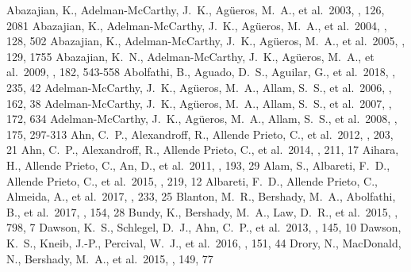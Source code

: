 
	\begin{thebibliography}{}

 Abazajian, K., Adelman-McCarthy, J.~K., Ag{\"u}eros, M.~A., et al.\ 2003, \aj, 126, 2081 %
 Abazajian, K., Adelman-McCarthy, J.~K., Ag{\"u}eros, M.~A., et al.\ 2004, \aj, 128, 502 %
 Abazajian, K., Adelman-McCarthy, J.~K., Ag{\"u}eros, M.~A., et al.\ 2005, \aj, 129, 1755 %
 Abazajian, K.~N., Adelman-McCarthy, J.~K., Ag{\"u}eros, M.~A., et al.\ 2009, \apjs, 182, 543-558 %
 Abolfathi, B., Aguado, D.~S., Aguilar, G., et al.\ 2018, \apjs, 235, 42 %
 Adelman-McCarthy, J.~K., Ag{\"u}eros, M.~A., Allam, S.~S., et al.\ 2006, \apjs, 162, 38 %
 Adelman-McCarthy, J.~K., Ag{\"u}eros, M.~A., Allam, S.~S., et al.\ 2007, \apjs, 172, 634 %
 Adelman-McCarthy, J.~K., Ag{\"u}eros, M.~A., Allam, S.~S., et al.\ 2008, \apjs, 175, 297-313 %
 Ahn, C.~P., Alexandroff, R., Allende Prieto, C., et al.\ 2012, \apjs, 203, 21 %
 Ahn, C.~P., Alexandroff, R., Allende Prieto, C., et al.\ 2014, \apjs, 211, 17 %
 Aihara, H., Allende Prieto, C., An, D., et al.\ 2011, \apjs, 193, 29 %
 Alam, S., Albareti, F.~D., Allende Prieto, C., et al.\ 2015, \apjs, 219, 12 %
 Albareti, F.~D., Allende Prieto, C., Almeida, A., et al.\ 2017, \apjs, 233, 25 %
 Blanton, M.~R., Bershady, M.~A., Abolfathi, B., et al.\ 2017, \aj, 154, 28 %
 Bundy, K., Bershady, M.~A., Law, D.~R., et al.\ 2015, \apj, 798, 7 %
 Dawson, K.~S., Schlegel, D.~J., Ahn, C.~P., et al.\ 2013, \aj, 145, 10 %
 Dawson, K.~S., Kneib, J.-P., Percival, W.~J., et al.\ 2016, \aj, 151, 44 %
 Drory, N., MacDonald, N., Bershady, M.~A., et al.\ 2015, \aj, 149, 77 %

\end{thebibliography}
